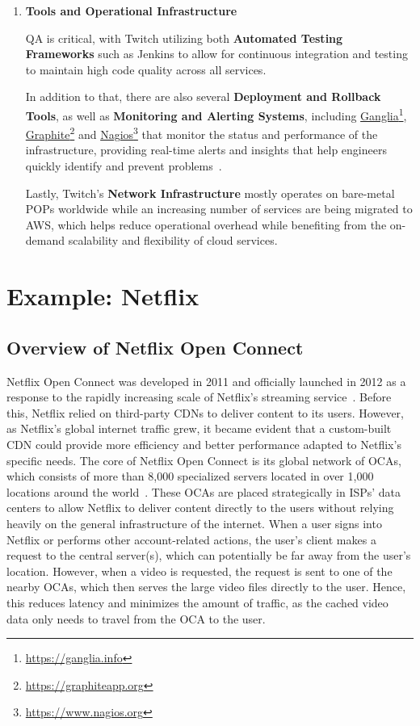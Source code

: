 \begin{enumerate}
    \item \textbf{Tools and Operational Infrastructure}

    \ac{QA} is critical, with Twitch utilizing both \textbf{Automated Testing Frameworks} such as Jenkins to allow for continuous integration and testing to maintain high code quality across all services.

    In addition to that, there are also several \textbf{Deployment and Rollback Tools}, as well as \textbf{Monitoring and Alerting Systems}, including \href{https://ganglia.info}{Ganglia}\footnote{\url{https://ganglia.info}}, \href{https://graphiteapp.org}{Graphite}\footnote{\url{https://graphiteapp.org}} and \href{https://www.nagios.org}{Nagios}\footnote{\url{https://www.nagios.org}} that monitor the status and performance of the infrastructure, providing real-time alerts and insights that help engineers quickly identify and prevent problems~\parencite{twitch_engineering}.

    Lastly, Twitch’s \textbf{Network Infrastructure} mostly operates on bare-metal \ac{POPs} worldwide while an increasing number of services are being migrated to \ac{AWS}, which helps reduce operational overhead while benefiting from the on-demand scalability and flexibility of cloud services.

\end{enumerate}

\section{Example: Netflix}


\subsection{Overview of Netflix Open Connect}

Netflix Open Connect was developed in 2011 and officially launched in 2012 as a response to the rapidly increasing scale of Netflix's streaming service~\parencite{netflix_functionality}. Before this, Netflix relied on third-party \ac{CDN}s to deliver content to its users. However, as Netflix's global internet traffic grew, it became evident that a custom-built \ac{CDN} could provide more efficiency and better performance adapted to Netflix's specific needs.
The core of Netflix Open Connect is its global network of \ac{OCAs}, which consists of more than 8,000 specialized servers located in over 1,000 locations around the world~\parencite{netflix_open_connect}. These \ac{OCAs} are placed strategically in \ac{ISPs}' data centers to allow Netflix to deliver content directly to the users without relying heavily on the general infrastructure of the internet.
When a user signs into Netflix or performs other account-related actions, the user's client makes a request to the central server(s), which can potentially be far away from the user's location. However, when a video is requested, the request is sent to one of the nearby \ac{OCAs}, which then serves the large video files directly to the user. Hence, this reduces latency and minimizes the amount of traffic, as the cached video data only needs to travel from the OCA to the user.

